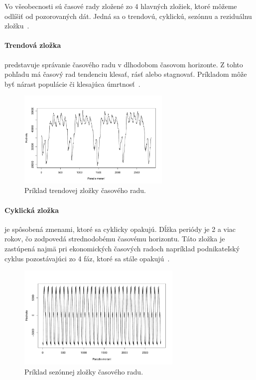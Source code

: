 \documentclass[a4paper,slovak,12pt,appendix]{article}
\begin{document}
Vo všeobecnosti sú časové rady zložené zo 4 hlavných zložiek, ktoré môžeme
odlíšiť od pozorovaných dát. Jedná sa o trendovú, cyklickú, sezónnu
a reziduálnu zložku~\cite{Agrawal2013}.

\paragraph{Trendová zložka} predstavuje správanie časového radu v dlhodobom
časovom horizonte. Z tohto pohľadu má časový rad tendenciu klesať, rásť alebo
stagnovať. Príkladom môže byť nárast populácie či klesajúca
úmrtnosť~\cite{Agrawal2013}.

\begin{figure}[!ht]
  \centering
  \includegraphics[width=0.65\textwidth]{trend_component.pdf}
  \caption{Príklad trendovej zložky časového radu.}
  \label{fig-trend-comp}
\end{figure}

\paragraph{Cyklická zložka} je spôsobená zmenami, ktoré sa cyklicky opakujú.
Dĺžka periódy je 2 a viac rokov, čo zodpovedá strednodobému časovému horizontu.
Táto zložka je zastúpená najmä pri ekonomických časových radoch napríklad
podnikateľský cyklus pozostávajúci zo 4 fáz, ktoré sa stále
opakujú~\cite{Agrawal2013}.

\begin{figure}[H]
  \centering
  \includegraphics[width=0.7\textwidth]{season_component.pdf}
  \caption{Príklad sezónnej zložky časového radu.}
  \label{fig-season-comp}
\end{figure}
\end{document}
